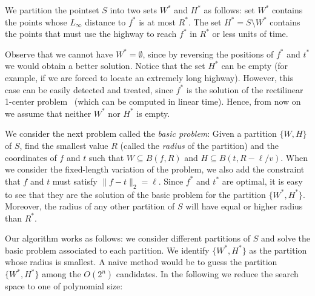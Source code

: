 \documentclass{llncs}
\newcommand{\ball}[1]{B({#1})}
\begin{document}
\medskip

We partition the pointset $S$ into two sets $W^*$ and $H^*$ as follows: set $W^*$ contains the points whose $L_\infty$ distance to $f^*$ is at most $R^*$. The set $H^*=S\setminus W^*$ contains the points that must use the highway to reach $f^*$ in $R^*$ or less units of time.

Observe that we cannot have $W^*=\emptyset$, since by reversing the positions of $f^*$ and $t^*$ we would obtain a better solution. Notice that the set $H^*$ can be empty (for example, if we are forced to locate an extremely long highway). However, this case can be easily detected and treated, since $f^*$ is the solution of the rectilinear 1-center problem~\cite{drezner87} (which can be computed in linear time).
Hence, from now on we assume that neither $W^*$ nor $H^*$ is empty.

We consider the next problem called the \emph{basic problem}: Given a partition $\{W,H\}$ of $S$, find the smallest value $R$ (called the {\em radius} of the partition) and the coordinates of $f$ and $t$ such that $W\subseteq \ball{f,R}$ and $H\subseteq \ball{t,R-\ell/v}$. When we consider the fixed-length variation of the problem, we also add the constraint that $f$ and $t$ must satisfy $\|f-t\|_2=\ell$. Since $f^*$ and $t^*$ are optimal, it is easy to see that they are the solution of the basic problem for the partition $\{W^*,H^*\}$. Moreover, the radius of any other partition of $S$ will have equal or higher radius than $R^*$.

Our algorithm works as follows: we consider different partitions of $S$ and solve the basic problem associated to each partition. We identify $\{W^*,H^*\}$ as the partition whose radius is smallest. A naive method would be to guess the partition $\{W^*,H^*\}$ among the $O(2^n)$ candidates. In the following we reduce the search space to one of polynomial size:
\end{document}
